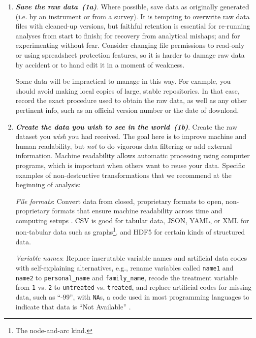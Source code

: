 \documentclass[10pt,letterpaper]{article}
\newcommand{\practice}[2]{\textbf{\emph{{#2}~({#1})}}}
\begin{document}
\begin{enumerate}

\item
  \practice{1a}{Save the raw data}.  Where possible,
  save data as originally generated (i.e. by an instrument or from a survey).
  It is
  tempting to overwrite raw data files with cleaned-up versions, but
  faithful retention is essential for re-running analyses
  from start to finish; for recovery from analytical
  mishaps; and for experimenting without fear. Consider changing file permissions to
  read-only or using spreadsheet protection features,
  so it is harder to damage raw
  data by accident or to hand edit it in a moment of weakness.

  Some data will be impractical to manage in this way. For example, you should avoid
  making local copies of large, stable repositories.
  In that case, record the exact procedure used to obtain the raw data, as well
  as any other pertinent info, such as an official version number or the date of download.

\item
  \practice{1b}{Create the data you wish to see in the world}. Create the raw dataset you
  \emph{wish} you had received.  The goal here is to improve machine and human
  readability, but \emph{not} to do vigorous data filtering or add external information.
  Machine readability allows automatic processing using computer programs,
  which is important when others want to reuse your data.
  Specific examples of non-destructive transformations that we recommend at the beginning
  of analysis:

  \emph{File formats}: Convert data from closed, proprietary formats to open,
  non-proprietary formats that ensure machine readability across time and computing
  setups \cite{ffIllinois}. CSV is good for tabular data, JSON, YAML, or XML for
  non-tabular data such as graphs\footnote{The node-and-arc kind.}, and HDF5 for certain
  kinds of structured data.

  \emph{Variable names}: Replace inscrutable variable names
  and artificial data codes with self-explaining alternatives, e.g.,
  rename variables called \texttt{name1} and \texttt{name2} to
  \texttt{personal\_name} and \texttt{family\_name}, recode the
  treatment variable from \texttt{1} vs.  \texttt{2} to
  \texttt{untreated} vs. \texttt{treated}, and replace artificial
  codes for missing data, such as ``-99'', with \texttt{NA}s,
  a code used in most programming languages to indicate that data is ``Not Available''
  \cite{white2013}.


\end{enumerate}
\end{document}

